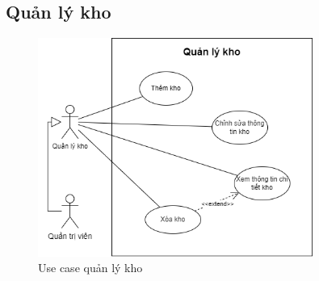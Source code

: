 \subsection{Quản lý kho}
\begin{figure}[!htp]
    \centering
    \includegraphics[width=9cm]{img/UseCase/UseCase-Quản lý kho.drawio.png}
    \newline
    \caption{Use case quản lý kho}
\end{figure}


